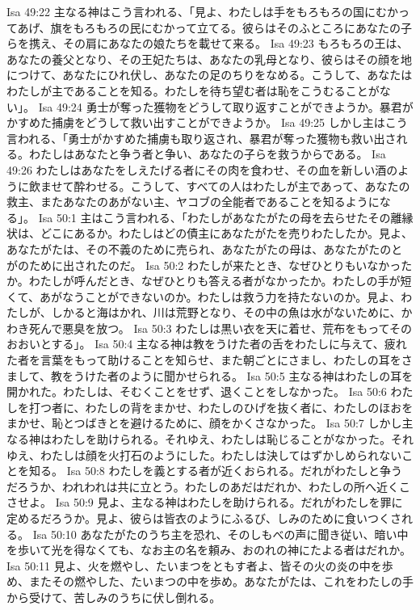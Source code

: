 Isa 49:22  主なる神はこう言われる、「見よ、わたしは手をもろもろの国にむかってあげ、旗をもろもろの民にむかって立てる。彼らはそのふところにあなたの子らを携え、その肩にあなたの娘たちを載せて来る。
Isa 49:23  もろもろの王は、あなたの養父となり、その王妃たちは、あなたの乳母となり、彼らはその顔を地につけて、あなたにひれ伏し、あなたの足のちりをなめる。こうして、あなたはわたしが主であることを知る。わたしを待ち望む者は恥をこうむることがない」。
Isa 49:24  勇士が奪った獲物をどうして取り返すことができようか。暴君がかすめた捕虜をどうして救い出すことができようか。
Isa 49:25  しかし主はこう言われる、「勇士がかすめた捕虜も取り返され、暴君が奪った獲物も救い出される。わたしはあなたと争う者と争い、あなたの子らを救うからである。
Isa 49:26  わたしはあなたをしえたげる者にその肉を食わせ、その血を新しい酒のように飲ませて酔わせる。こうして、すべての人はわたしが主であって、あなたの救主、またあなたのあがない主、ヤコブの全能者であることを知るようになる」。
Isa 50:1  主はこう言われる、「わたしがあなたがたの母を去らせたその離縁状は、どこにあるか。わたしはどの債主にあなたがたを売りわたしたか。見よ、あなたがたは、その不義のために売られ、あなたがたの母は、あなたがたのとがのために出されたのだ。
Isa 50:2  わたしが来たとき、なぜひとりもいなかったか。わたしが呼んだとき、なぜひとりも答える者がなかったか。わたしの手が短くて、あがなうことができないのか。わたしは救う力を持たないのか。見よ、わたしが、しかると海はかれ、川は荒野となり、その中の魚は水がないために、かわき死んで悪臭を放つ。
Isa 50:3  わたしは黒い衣を天に着せ、荒布をもってそのおおいとする」。
Isa 50:4  主なる神は教をうけた者の舌をわたしに与えて、疲れた者を言葉をもって助けることを知らせ、また朝ごとにさまし、わたしの耳をさまして、教をうけた者のように聞かせられる。
Isa 50:5  主なる神はわたしの耳を開かれた。わたしは、そむくことをせず、退くことをしなかった。
Isa 50:6  わたしを打つ者に、わたしの背をまかせ、わたしのひげを抜く者に、わたしのほおをまかせ、恥とつばきとを避けるために、顔をかくさなかった。
Isa 50:7  しかし主なる神はわたしを助けられる。それゆえ、わたしは恥じることがなかった。それゆえ、わたしは顔を火打石のようにした。わたしは決してはずかしめられないことを知る。
Isa 50:8  わたしを義とする者が近くおられる。だれがわたしと争うだろうか、われわれは共に立とう。わたしのあだはだれか、わたしの所へ近くこさせよ。
Isa 50:9  見よ、主なる神はわたしを助けられる。だれがわたしを罪に定めるだろうか。見よ、彼らは皆衣のようにふるび、しみのために食いつくされる。
Isa 50:10  あなたがたのうち主を恐れ、そのしもべの声に聞き従い、暗い中を歩いて光を得なくても、なお主の名を頼み、おのれの神にたよる者はだれか。
Isa 50:11  見よ、火を燃やし、たいまつをともす者よ、皆その火の炎の中を歩め、またその燃やした、たいまつの中を歩め。あなたがたは、これをわたしの手から受けて、苦しみのうちに伏し倒れる。
